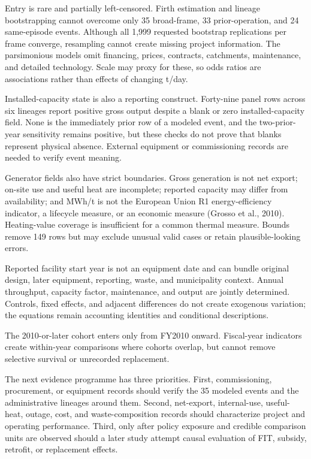 \documentclass[12pt,a4paper]{article}
\begin{document}
Entry is rare and partially left-censored. Firth estimation and lineage
bootstrapping cannot overcome only 35 broad-frame, 33 prior-operation, and 24
same-episode events. Although all 1,999 requested bootstrap replications per
frame converge, resampling cannot create missing project information. The
parsimonious models omit financing, prices, contracts, catchments, maintenance,
and detailed technology. Scale may
proxy for these, so odds ratios are associations rather than effects of changing
t/day.

Installed-capacity state is also a reporting construct. Forty-nine panel rows
across six lineages report positive gross output despite a blank or zero
installed-capacity field. None is the immediately prior row of a modeled event,
and the two-prior-year sensitivity remains positive, but these checks do not
prove that blanks represent physical absence. External equipment or
commissioning records are needed to verify event meaning.

Generator fields also have strict boundaries. Gross generation is not net
export; on-site use and useful heat are incomplete; reported capacity may differ
from availability; and MWh/t is not the European Union R1 energy-efficiency
indicator, a lifecycle measure, or an economic measure (Grosso et al., 2010).
Heating-value coverage is insufficient for a common thermal measure. Bounds
remove 149 rows but may exclude unusual valid cases or retain plausible-looking
errors.

Reported facility start year is not an equipment date and can bundle original
design, later equipment, reporting, waste, and municipality context. Annual throughput,
capacity factor, maintenance, and output are jointly determined. Controls,
fixed effects, and adjacent differences do not create exogenous variation; the
equations remain accounting identities and conditional descriptions.

The 2010-or-later cohort enters only from FY2010 onward. Fiscal-year indicators
create within-year comparisons where cohorts overlap, but cannot remove
selective survival or unrecorded replacement.

The next evidence programme has three priorities. First, commissioning,
procurement, or equipment records should verify the 35 modeled events and the
administrative lineages around them. Second, net-export, internal-use, useful-
heat, outage, cost, and waste-composition records should characterize project
and operating performance. Third, only after policy exposure and credible
comparison units are observed should a later study attempt causal evaluation of
FIT, subsidy, retrofit, or replacement effects.
\end{document}

